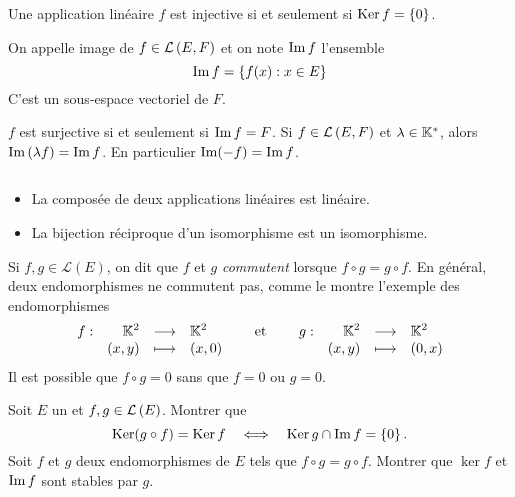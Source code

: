 \documentclass{magnolia}
\begin{document}


\begin{proposition}[utile=3]
Une application linéaire $f$ est injective si et seulement si
\mbox{$\mathop{\rm Ker} f=\left\{0\right\}$}.
\end{proposition}

\begin{definition}[utile=-3]
On appelle image de $f\in\mathcal{L}\left(E,F\right)$ et on note $\operatorname{Im} f$ l'ensemble
\[\operatorname{Im} f=\left\{f(x) : x\in E\right\}\]
C'est un sous-espace vectoriel de $F$.
\end{definition}

\begin{remarques}
\remarque[utile=-3] $f$ est surjective si et seulement si $\operatorname{Im} f=F$.
\remarque[utile=1] Si $f\in\mathcal{L}\left(E,F\right)$ et $\lambda\in\mathbb{K}^*$, alors $\operatorname{Im}\left(\lambda f\right)=\operatorname{Im} f$. En particulier
  $\operatorname{Im}(-f)=\operatorname{Im} f$.
\end{remarques}


\begin{proposition}[utile=-3]
$\quad$
\begin{itemize}
\item La composée de deux applications linéaires est linéaire.
\item La bijection réciproque d'un isomorphisme est un isomorphisme.
\end{itemize}
\end{proposition}

\begin{remarques}
\remarque Si $f,g\in\mathcal{L}(E)$, on dit que $f$ et $g$ \emph{commutent} lorsque $f\circ g=g\circ f$.
  En général, deux endomorphismes ne commutent pas, comme le montre l'exemple des endomorphismes
  \[\begin{array}[t]{lrcl} \displaystyle{f} : & \displaystyle{\ensuremath{\mathbb{K}}^2} & \longrightarrow & \displaystyle{\ensuremath{\mathbb{K}}^2} \\ & \displaystyle{(x,y)} & \longmapsto & \displaystyle{(x, 0)} \end{array} \quad\quad\!\text{et}\quad\!\quad
    \begin{array}[t]{lrcl} \displaystyle{g} : & \displaystyle{\ensuremath{\mathbb{K}}^2} & \longrightarrow & \displaystyle{\ensuremath{\mathbb{K}}^2} \\ & \displaystyle{(x,y)} & \longmapsto & \displaystyle{(0,x)} \end{array}\]
\remarque Il est possible que $f\circ g=0$ sans que $f=0$ ou $g=0$.
\end{remarques}

\begin{exos}
\exo Soit $E$ un \Kev et $f,g\in\mathcal{L}\left(E\right)$. Montrer que
  \[\mathop{\rm Ker}(g\circ f)=\mathop{\rm Ker} f \quad\Longleftrightarrow\quad \mathop{\rm Ker} g\cap\operatorname{Im} f=\left\{0\right\}.\]
\exo Soit $f$ et $g$ deux endomorphismes de $E$ tels que
  $f\circ g=g\circ f$. Montrer que $\ker f$ et $\operatorname{Im} f$ sont stables par $g$.
\end{exos}
\end{document}
